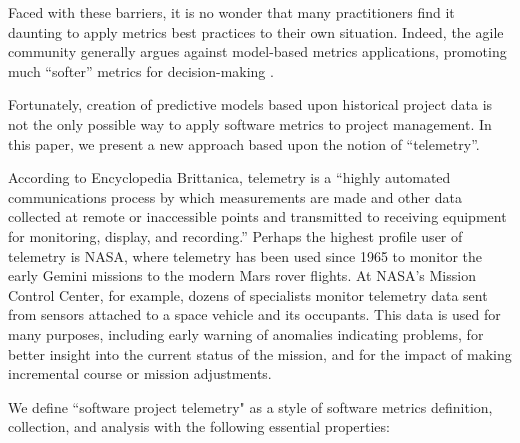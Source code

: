 \documentclass[11pt,twocolumn]{article}
\begin{document}
Faced with these barriers, it is no wonder that many practitioners find it
daunting to apply metrics best practices to their own situation. Indeed,
the agile community generally argues against model-based metrics
applications, promoting much ``softer'' metrics for decision-making
\cite{Beck00}.

Fortunately, creation of predictive models based upon historical project
data is not the only possible way to apply software metrics to project
management.  In this paper, we present a new approach based upon the notion
of ``telemetry''.


According to Encyclopedia Brittanica, telemetry is a ``highly automated
communications process by which measurements are made and other data
collected at remote or inaccessible points and transmitted to receiving
equipment for monitoring, display, and recording.''  Perhaps the highest
profile user of telemetry is NASA, where telemetry has been used since 1965
to monitor the early Gemini missions to the modern Mars rover flights.  At
NASA's Mission Control Center, for example, dozens of specialists monitor
telemetry data sent from sensors attached to a space vehicle and its
occupants.  This data is used for many purposes, including early warning of
anomalies indicating problems, for better insight into the current status
of the mission, and for the impact of making incremental course or mission
adjustments.

We define ``software project telemetry" as a style of software metrics
definition, collection, and analysis with the following essential
properties:
\end{document}
